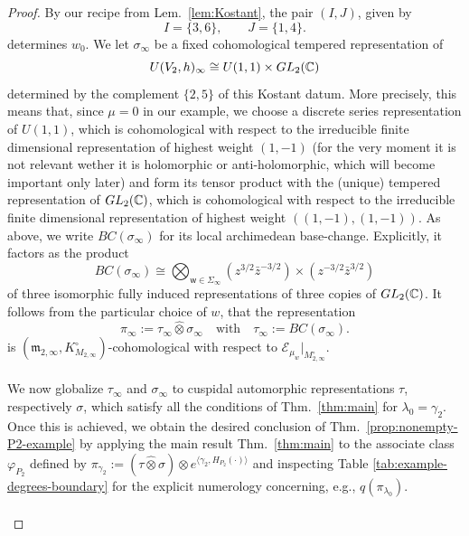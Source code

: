 \documentclass[10pt,a4paper]{amsart}
\def\C{\mathbb C}
\def\EE{\mathcal E}
\def\GL{{\rm GL}}
\def\m{\mathfrak m}
\def\ww{\mathsf w}
\begin{document}
\begin{proof}
By our recipe from Lem.\ \ref{lem:Kostant},  the pair $(I,J)$, given by
$$
        I=\{3,6\},
        \qquad
        J=\{1,4\}.
$$
determines $w_0$. We let $\sigma_\infty$ be a fixed cohomological tempered representation of
$$
        U(V_2,h)_\infty
        \cong
        U(1,1)\times \GL_2(\mathbb C)
$$
determined by the complement $\{2,5\}$ of this Kostant datum. More precisely, this means that, since $\mu=0$ in our example, we choose a discrete series representation of $U(1,1)$, which is cohomological with respect to the irreducible finite dimensional representation of highest weight $(1,-1)$ (for the very moment it is not relevant wether it is holomorphic or anti-holomorphic, which will become important only later) and form its tensor product with the (unique) tempered representation of $\GL_2(\C)$, which is cohomological with respect to the irreducible finite dimensional representation of highest weight $((1,-1),(1,-1))$. As above, we write $BC(\sigma_\infty)$ for its local archimedean base-change. Explicitly, it factors as the product 
\begin{equation}\label{BCok}
BC(\sigma_\infty)\cong \bigotimes_{\ww\in\Sigma_\infty}
        \left(z^{3/2}\bar z^{-3/2}\right)
        \times
        \left(z^{-3/2}\bar z^{3/2}\right)
\end{equation}
of three isomorphic fully induced representations of three copies of $\GL_2(\mathbb C)$. It follows from the particular choice of \(w\), that the representation 
$$
        \pi_\infty
        :=
        \tau_\infty\widehat\otimes\sigma_\infty
        \quad\text{with}\quad
        \tau_\infty:= BC(\sigma_\infty).
$$
is $(\m_{2,\infty}, K^\circ_{M_{2,\infty}})$-cohomological with respect to $\EE_{\mu_w}|_{M^\circ_{2,\infty}}$.\\\\ 
We now globalize $\tau_\infty$ and $\sigma_\infty$ to cuspidal automorphic representations $\tau$, respectively $\sigma$, which satisfy all the conditions of Thm.\ \ref{thm:main} for $\lambda_0=\gamma_2$. Once this is achieved, we obtain the desired conclusion of Thm.\ \ref{prop:nonempty-P2-example} by applying the main result Thm.\ \ref{thm:main} to the associate class $\varphi_{P_2}$ defined by $\pi_{\gamma_2}:=(\tau\hat\otimes\sigma)\otimes e^{\langle \gamma_2, H_{P_2}(\cdot)\rangle}$ and inspecting Table \ref{tab:example-degrees-boundary} for the explicit numerology concerning, e.g., $q(\pi_{\lambda_0})$.\\\\

\end{proof}
\end{document}
